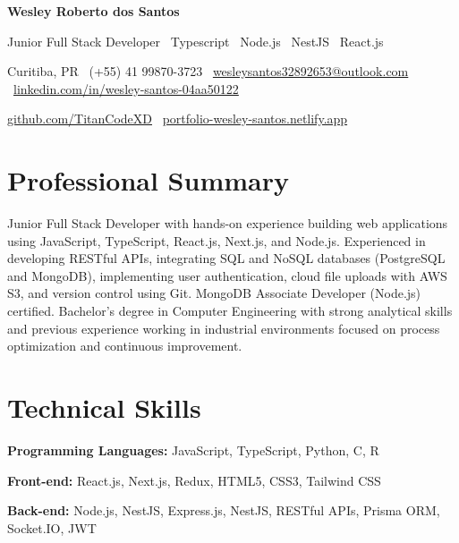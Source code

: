 \documentclass[11pt,a4paper]{article}
\begin{document}

{\LARGE\bfseries\color{headingblue} Wesley Roberto dos Santos}\par
\vspace{2pt}
{\large\color{graytext} Junior Full Stack Developer \textbar\ Typescript \textbar\ Node.js \textbar\ NestJS \textbar\ React.js}\par
\vspace{4pt}

\noindent
Curitiba, PR \textbar\
(+55) 41 99870-3723 \textbar\
\href{mailto:wesleysantos32892653@outlook.com}{wesleysantos32892653@outlook.com}
\textbar\
\href{https://linkedin.com/in/wesley-santos-04aa50122}{linkedin.com/in/wesley-santos-04aa50122}

\noindent
\href{https://github.com/TitanCodeXD}{github.com/TitanCodeXD}
\textbar\
\href{https://portfolio-wesley-santos.netlify.app}{portfolio-wesley-santos.netlify.app}


\section{Professional Summary}

Junior Full Stack Developer with hands-on experience building web applications using JavaScript, TypeScript, React.js, Next.js, and Node.js. Experienced in developing RESTful APIs, integrating SQL and NoSQL databases (PostgreSQL and MongoDB), implementing user authentication, cloud file uploads with AWS S3, and version control using Git. MongoDB Associate Developer (Node.js) certified. Bachelor's degree in Computer Engineering with strong analytical skills and previous experience working in industrial environments focused on process optimization and continuous improvement.


\section{Technical Skills}

\textbf{Programming Languages:} JavaScript, TypeScript, Python, C, R

\textbf{Front-end:} React.js, Next.js, Redux, HTML5, CSS3, Tailwind CSS

\textbf{Back-end:} Node.js, NestJS, Express.js, NestJS, RESTful APIs, Prisma ORM, Socket.IO, JWT
\end{document}
